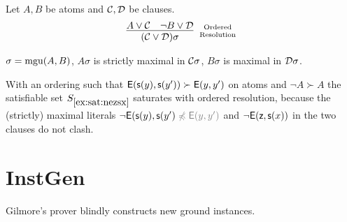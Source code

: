 \begin{definition} Let $A, B$ be atoms and ${\mathcal C},{\mathcal D}$ be clauses.
	\begin{gather*}
	\infer
	[\text{Ordered}\atop\text{Resolution}] 
	{(\mcC\lor\mcD)\sigma}
	{A\lor\mcC&\lnot B\lor\mcD}
	\end{gather*}
	\begin{center}$\sigma=\operatorname{mgu}(A,B)$, 
		$A\sigma$ is strictly maximal in ${\mathcal C}\sigma$, 
		$B\sigma$ is maximal in ${\mathcal D}\sigma$.
	\end{center}
\end{definition}

\begin{example}
	With an ordering such that ${\mathsf{E}}({\mathsf s}(y),{\mathsf s}(y')) \succ {\mathsf{E}}(y,y')$ on atoms and ${\lnot A} \succ A$
	the satisfiable set $S_{\ref{ex:sat:nezsx}}$ saturates with ordered resolution,
	because the (strictly) maximal literals 
	$\lnot \mE(\msucc(y),\msucc(y') \colG\not\preccurlyeq \mE(y,y') $
	and $\lnot{\mathsf{E}}({\mathsf z},{\mathsf s}(x))$
	in the two clauses do not clash.
\end{example}

\section{InstGen}

Gilmore's prover blindly constructs new ground instances. 

